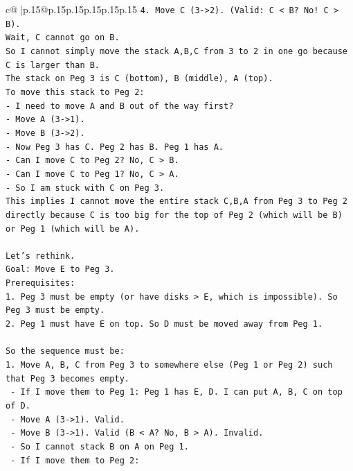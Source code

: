 \documentclass{article}
\begin{document}
{\begin{supertabular}{c@{$\;$}|p{.15\linewidth}@{}p{.15\linewidth}p{.15\linewidth}p{.15\linewidth}p{.15\linewidth}p{.15\linewidth}}
{{{\texttt{4. Move C (3{-}>2). (Valid: C < B? No! C > B).} \\
\texttt{Wait, C cannot go on B.} \\
\texttt{So I cannot simply move the stack A,B,C from 3 to 2 in one go because C is larger than B.} \\
\texttt{The stack on Peg 3 is C (bottom), B (middle), A (top).} \\
\texttt{To move this stack to Peg 2:} \\
\texttt{{-} I need to move A and B out of the way first?} \\
\texttt{{-} Move A (3{-}>1).} \\
\texttt{{-} Move B (3{-}>2).} \\
\texttt{{-} Now Peg 3 has C. Peg 2 has B. Peg 1 has A.} \\
\texttt{{-} Can I move C to Peg 2? No, C > B.} \\
\texttt{{-} Can I move C to Peg 1? No, C > A.} \\
\texttt{{-} So I am stuck with C on Peg 3.} \\
\texttt{This implies I cannot move the entire stack C,B,A from Peg 3 to Peg 2 directly because C is too big for the top of Peg 2 (which will be B) or Peg 1 (which will be A).} \\
\\ 
\texttt{Let's rethink.} \\
\texttt{Goal: Move E to Peg 3.} \\
\texttt{Prerequisites:} \\
\texttt{1. Peg 3 must be empty (or have disks > E, which is impossible). So Peg 3 must be empty.} \\
\texttt{2. Peg 1 must have E on top. So D must be moved away from Peg 1.} \\
\\ 
\texttt{So the sequence must be:} \\
\texttt{1. Move A, B, C from Peg 3 to somewhere else (Peg 1 or Peg 2) such that Peg 3 becomes empty.} \\
\texttt{   {-} If I move them to Peg 1: Peg 1 has E, D. I can put A, B, C on top of D.} \\
\texttt{     {-} Move A (3{-}>1). Valid.} \\
\texttt{     {-} Move B (3{-}>1). Valid (B < A? No, B > A). Invalid.} \\
\texttt{     {-} So I cannot stack B on A on Peg 1.} \\
\texttt{   {-} If I move them to Peg 2:} \\
}}}
\end{supertabular}}
\end{document}
